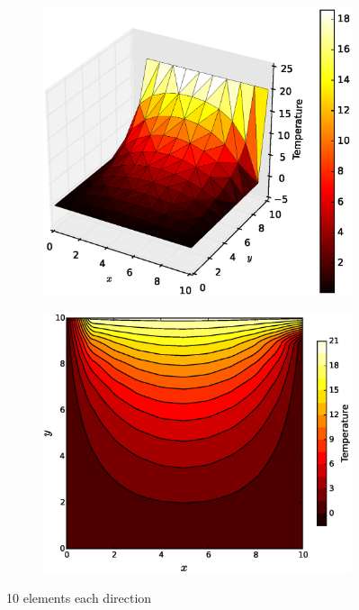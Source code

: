 \documentclass[10pt, a4paper]{article}
\begin{document}
\begin{figure}[H]
\centering
	\begin{subfigure}[H]{0.5\textwidth}
		\includegraphics[width=1.2\textwidth]{fig/figure_1.eps}
		\caption{}
		\label{fig:1}
	\end{subfigure}
	\begin{subfigure}[H]{0.3\textwidth}
		\includegraphics[width=\textwidth]{fig/figure_1.1.eps}
		\caption{}
		\label{fig:2}
	\end{subfigure}
	\caption{10 elements each direction}
	\label{fig:3_1}
\end{figure}
\end{document}
